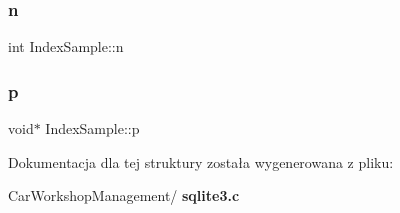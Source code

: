 \mbox{\label{struct_index_sample_a89016f3b6580ee9c63c4ac78e2e6e76c}} 
\subsubsection{n}
{\footnotesize\ttfamily int Index\+Sample\+::n}

\mbox{\label{struct_index_sample_a539f00d3096fd379146e77e74b513dac}} 
\subsubsection{p}
{\footnotesize\ttfamily void$\ast$ Index\+Sample\+::p}



Dokumentacja dla tej struktury została wygenerowana z pliku\+:\begin{DoxyCompactItemize}
\item 
Car\+Workshop\+Management/\textbf{ sqlite3.\+c}\end{DoxyCompactItemize}
